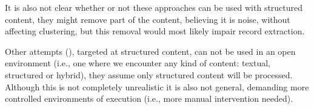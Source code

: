  
It is also not clear whether or not these approaches can
be used with structured content, they might remove part of the content,
believing it is noise, without affecting clustering, but this removal would most
likely impair record extraction.
 

 Other attempts (\cite{TPS2013,Velloso:2017:ERW:3132847.3132875}), targeted at
structured content, can not be used in an open environment (i.e., one where we
encounter any kind of content: textual, structured  or hybrid), they assume only
structured content will be processed. Although this is not completely
unrealistic it is also not general, demanding more controlled environments of
execution (i.e., more manual intervention needed).




